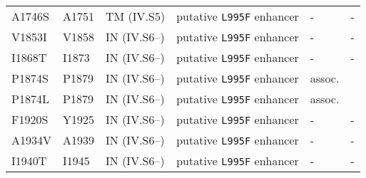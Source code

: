 \begin{tabular}{llllll}
A1746S & A1751 & TM (IV.S5) & putative \texttt{L995F} enhancer & - & - \\

V1853I & V1858 & IN (IV.S6--) & putative \texttt{L995F} enhancer & - & - \\

I1868T & I1873 & IN (IV.S6--) & putative \texttt{L995F} enhancer & - & - \\

P1874S & P1879 & IN (IV.S6--) & putative \texttt{L995F} enhancer & assoc. & \cite{Sonoda2008} \\

P1874L & P1879 & IN (IV.S6--) & putative \texttt{L995F} enhancer & assoc. & \cite{Sonoda2008} \\

F1920S & Y1925 & IN (IV.S6--) & putative \texttt{L995F} enhancer & - & - \\

A1934V & A1939 & IN (IV.S6--) & putative \texttt{L995F} enhancer & - & - \\

I1940T & I1945 & IN (IV.S6--) & putative \texttt{L995F} enhancer & - & - \\

\bottomrule
\end{tabular}
